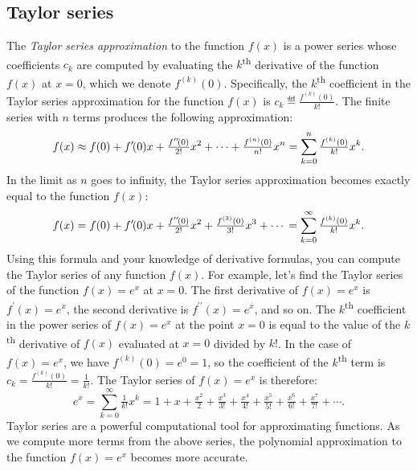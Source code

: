	\subsection{Taylor series}
	\label{series:taylor_series}

		The \emph{Taylor series approximation} to the function $f(x)$
		is a power series whose coefficients $c_k$
		are computed by evaluating the $k$\textsuperscript{th} derivative of the function $f(x)$ at $x=0$,
		which we denote $f^{(k)}(0)$.
		Specifically,
		the $k$\textsuperscript{th} coefficient in the Taylor series approximation
		for the function $f(x)$ is $c_k \eqdef \frac{f^{(k)}(0)}{k!}$.
		The finite series with $n$ %
		terms produces the following approximation:
		\[
			f(x)
		 		\approx f(0)
					+f^{\prime\!}(0)x
					+\tfrac{f^{\prime\prime\!}(0)}{2!}x^2
					+ \cdots
					+\tfrac{f^{(n)}(0)}{n!}x^n  \\
		 		= \sum_{k=0}^n \tfrac{f^{(k)}(0)}{k!}x^k.
		\]
		In the limit as $n$ goes to infinity,
		the Taylor series approximation becomes exactly equal to the function $f(x)$:
		\[
			f(x) = f(0)	+ f^{\prime\!}(0)x
					+ \tfrac{f^{\prime\prime\!}(0)}{2!}x^2
					+ \tfrac{f^{(3)}(0)}{3!}x^3 + \cdots \\
		 		= \sum_{k=0}^\infty \tfrac{f^{(k)}(0)}{k!}x^k.
		\]
		Using this formula and your knowledge of derivative formulas,
		you can compute the Taylor series of any function $f(x)$.
		For example,
		let's find the Taylor series of the function $f(x) = e^x$ at $x=0$.
		The first derivative of $f(x) = e^x$ is $f^{\prime\!}(x) = e^x$,
		the second derivative is $f^{\prime\prime\!}(x) = e^x$,
		and so on.
		The $k$\textsuperscript{th} coefficient in the power series of $f(x)=e^x$ at the point $x=0$ 
		is equal to the value of the $k$\textsuperscript{th} derivative of $f(x)$ evaluated at $x=0$
		divided by $k!$.
		In the case of $f(x) = e^x$,
		we have $f^{(k)}(0) = e^0 = 1$,
		so the coefficient of the $k$\textsuperscript{th} term is $c_k = \tfrac{f^{(k)}(0)}{k!}  = \tfrac{1}{k!}$.
		The Taylor series of $f(x) = e^x$ is therefore:
		\[
			e^x	= \textstyle \sum_{k=0}^\infty \tfrac{1}{k!}x^k
		 	 	= 1 + x + \tfrac{x^2}{2} + \tfrac{x^3}{3!} + \tfrac{x^4}{4!} + \tfrac{x^5}{5!} + \tfrac{x^6}{6!} + \tfrac{x^7}{7!}  + \cdots.
		 \]
		Taylor series are a powerful computational tool for approximating functions.
		As we compute more terms from the above series,
		the polynomial approximation to the function $f(x)=e^x$ becomes more accurate.

